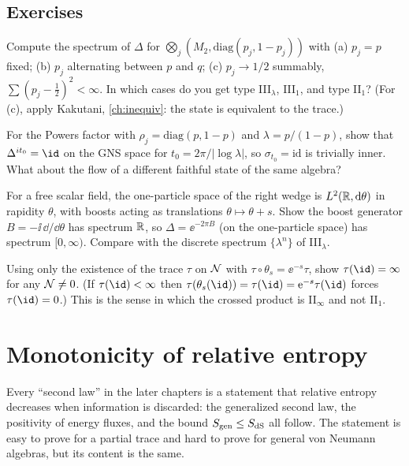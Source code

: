 \subsection*{Exercises}
\begin{exercise}\label{ex:connes_class:1}
Compute the spectrum of $\Delta$ for $\bigotimes_j(M_2,\mathrm{diag}(p_j,1-p_j))$ with (a) $p_j=p$ fixed; (b) $p_j$ alternating between $p$ and $q$; (c) $p_j\to1/2$ summably, $\sum(p_j-\frac12)^2<\infty$. In which cases do you get type III$_\lambda$, III$_1$, and type II$_1$? (For (c), apply Kakutani, \cref{ch:inequiv}: the state is equivalent to the trace.)
\end{exercise}
\begin{exercise}\label{ex:connes_class:2}
For the Powers factor with $\rho_j=\mathrm{diag}(p,1-p)$ and $\lambda=p/(1-p)$, show that $\Delta^{it_0}=\id$ on the GNS space for $t_0=2\pi/|\log\lambda|$, so $\sigma_{t_0}=\mathrm{id}$ is trivially inner. What about the flow of a different faithful state of the same algebra?
\end{exercise}
\begin{exercise}\label{ex:connes_class:3}
For a free scalar field, the one-particle space of the right wedge is $L^2(\mathbb{R},\mathrm{d}\theta)$ in rapidity $\theta$, with boosts acting as translations $\theta\mapsto\theta+s$. Show the boost generator $B=-\ii\,\dd/\dd\theta$ has spectrum $\mathbb{R}$, so $\Delta=\ee^{-2\pi B}$ (on the one-particle space) has spectrum $[0,\infty)$. Compare with the discrete spectrum $\{\lambda^n\}$ of III$_\lambda$.
\end{exercise}
\begin{exercise}\label{ex:connes_class:4}
Using only the existence of the trace $\tau$ on $\mathcal{N}$ with $\tau\circ\theta_s=\ee^{-s}\tau$, show $\tau(\id)=\infty$ for any $\mathcal{N}\ne0$. (If $\tau(\id)<\infty$ then $\tau(\theta_s(\id))=\tau(\id)=\ee^{-s}\tau(\id)$ forces $\tau(\id)=0$.) This is the sense in which the crossed product is II$_\infty$ and not II$_1$.
\end{exercise}


\section{Monotonicity of relative entropy}\label{ch:monotonic}
\begin{physmotiv}
Every ``second law'' in the later chapters is a statement that relative entropy decreases when information is discarded: the generalized second law, the positivity of energy fluxes, and the bound $S_{\mathrm{gen}}\le S_{\rm dS}$ all follow. The statement is easy to prove for a partial trace and hard to prove for general von Neumann algebras, but its content is the same.
\end{physmotiv}

